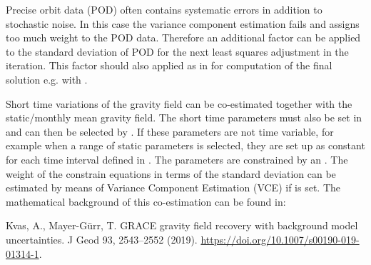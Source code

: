 Precise orbit data (POD) often contains systematic errors in addition to stochastic noise. In this case the
variance component estimation fails and assigns too much weight to the POD data. Therefore an additional
 factor can be applied to the standard deviation of POD for the next least squares adjustment
in the iteration. This factor should also applied as  in 
for computation of the final solution e.g. with .

Short time variations of the gravity field can be co-estimated together with the static/monthly
mean gravity field. The short time parameters must also be set in  and
can then be selected by .
If these parameters are not time variable, for example when a range of static parameters is selected,
they are set up as constant for each time interval defined in . The parameters are constrained by an
. The weight of
the constrain equations in terms of the standard deviation can be estimated by means of
Variance Component Estimation (VCE) if  is set.
The mathematical background of this co-estimation can be found in:

Kvas, A., Mayer-Gürr, T. GRACE gravity field recovery with background model uncertainties.
J Geod 93, 2543–2552 (2019). \url{https://doi.org/10.1007/s00190-019-01314-1}.


